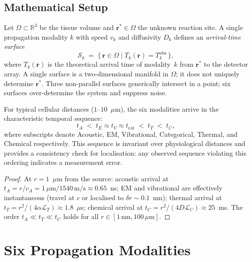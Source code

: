 \subsection{Mathematical Setup}

Let $\Omega \subset \mathbb{R}^{3}$ be the tissue volume and
$\mathbf{r}^{*} \in \Omega$ the unknown reaction site.  A single propagation
modality $k$ with speed $v_k$ and diffusivity $D_k$ defines an
\emph{arrival-time surface}
\begin{equation}
  \mathcal{S}_k
  \;=\;
  \bigl\{\,\mathbf{r} \in \Omega \;\big|\; T_k(\mathbf{r}) = T_k^{\mathrm{obs}}\,\bigr\},
  \label{eq:arrival-surface}
\end{equation}
where $T_k(\mathbf{r})$ is the theoretical arrival time of modality~$k$ from
$\mathbf{r}^{*}$ to the detector array.  A single surface is a
two-dimensional manifold in $\Omega$; it does not uniquely determine
$\mathbf{r}^{*}$.  Three non-parallel surfaces generically intersect in a
point; six surfaces over-determine the system and suppress noise.

\begin{proposition}
\label{prop:arrival-sequence}
For typical cellular distances ($1$--$10$~$\mu$m), the six modalities arrive
in the characteristic temporal sequence:
\[
    t_A \;<\; t_E \approx t_V \approx t_\mathrm{cat}
    \;<\; t_T \;<\; t_C,
\]
where subscripts denote Acoustic, EM, Vibrational, Categorical, Thermal, and
Chemical respectively.  This sequence is invariant over physiological
distances and provides a consistency check for localisation: any observed
sequence violating this ordering indicates a measurement error.
\end{proposition}

\begin{proof}
At $r = 1$~$\mu$m from the source: acoustic arrival at $t_A = r/c_A =
1\,\mu\text{m}/1540\,\text{m/s} \approx 0.65$~ns; EM and vibrational are
effectively instantaneous (travel at $c$ or localised to $\delta r \sim 0.1$~nm);
thermal arrival at $t_T = r^2/(4\alpha\mathcal{L}_T) \approx 1.8$~$\mu$s;
chemical arrival at $t_C = r^2/(4D\mathcal{L}_C) \approx 25$~ms.  The order
$t_A \ll t_T \ll t_C$ holds for all $r \in [1\,\text{nm}, 100\,\mu\text{m}]$.
\end{proof}

\section{Six Propagation Modalities}
\label{sec:modalities}

